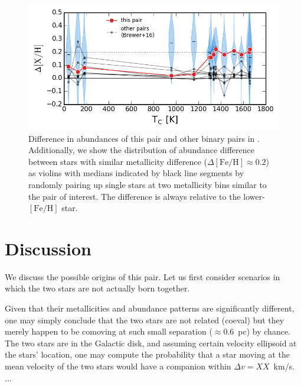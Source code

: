 \documentclass[manuscript]{aastex6}
\newcommand*\elem[1]{\ensuremath{\mathrm{#1}}}
\begin{document}
\begin{figure}[htpb]
  \centering
  \includegraphics[width=0.9\linewidth]{deltaXH_Tc_violins.png}
  \caption{Difference in abundances of this pair and other binary pairs in
    \citealt{2016ApJS..225...32B}.
    Additionally, we show the distribution of abundance difference
    between stars with similar metallicity difference
    ($\Delta[\elem{Fe}/\elem{H}] \approx 0.2$)
    as violins with medians indicated by black line segments
    by randomly pairing up single stars at two metallicity bins similar to
    the pair of interest.
    The difference is always relative to the lower-$[\elem{Fe}/\elem{H}]$ star.
  }
  \label{fig:deltaXH}
\end{figure}

\section{Discussion}
\label{sec:discussion}

We discuss the possible origins of this pair.
Let us first consider scenarios in which the two stars are not actually born together.

Given that their metallicities and abundance patterns are significantly
different, one may simply conclude that the two stars are not related (coeval)
but they merely happen to be comoving at such small separation ($\approx 0.6$~pc)
by chance.
The two stars are in the Galactic disk, and assuming certain velocity ellipsoid
at the stars' location, one may compute the probability that a star moving at
the mean velocity of the two stars would have a companion within $\Delta v = XX$~km/s.
...
\end{document}
